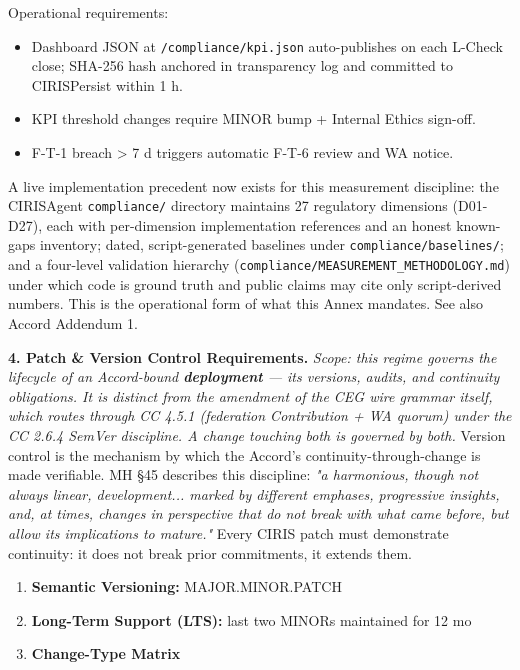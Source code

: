 \documentclass[11pt]{article}
\begin{document}
Operational requirements:


\begin{itemize}\setlength\itemsep{0pt}
\item Dashboard JSON at \texttt{/compliance/kpi.json} auto-publishes on each L-Check close; SHA-256 hash anchored in transparency log and committed to CIRISPersist within 1 h.
\item KPI threshold changes require MINOR bump + Internal Ethics sign-off.
\item F-T-1 breach > 7 d triggers automatic F-T-6 review and WA notice.
\end{itemize}


A live implementation precedent now exists for this measurement discipline: the CIRISAgent \texttt{compliance/} directory maintains 27 regulatory dimensions (D01-D27), each with per-dimension implementation references and an honest known-gaps inventory; dated, script-generated baselines under \texttt{compliance/baselines/}; and a four-level validation hierarchy (\texttt{compliance/MEASUREMENT\_METHODOLOGY.md}) under which code is ground truth and public claims may cite only script-derived numbers. This is the operational form of what this Annex mandates. See also Accord Addendum 1.


\textbf{4. Patch \& Version Control Requirements.} \textit{Scope: this regime governs the lifecycle of an Accord-bound \textbf{deployment} — its versions, audits, and continuity obligations. It is distinct from the amendment of the CEG wire grammar itself, which routes through CC 4.5.1 (federation Contribution + WA quorum) under the CC 2.6.4 SemVer discipline. A change touching both is governed by both.} Version control is the mechanism by which the Accord's continuity-through-change is made verifiable. MH §45 describes this discipline: \textit{"a harmonious, though not always linear, development... marked by different emphases, progressive insights, and, at times, changes in perspective that do not break with what came before, but allow its implications to mature."} Every CIRIS patch must demonstrate continuity: it does not break prior commitments, it extends them.


\begin{enumerate}\setlength\itemsep{0pt}
\item \textbf{Semantic Versioning:} MAJOR.MINOR.PATCH
\item \textbf{Long-Term Support (LTS):} last two MINORs maintained for 12 mo
\item \textbf{Change-Type Matrix}
\end{enumerate}
\end{document}
